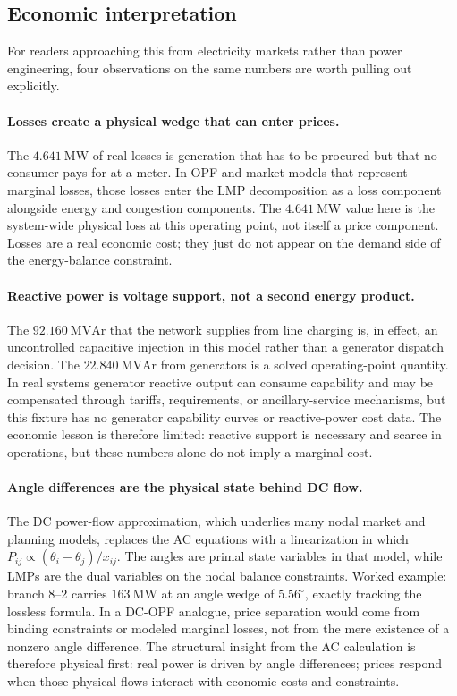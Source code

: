 \documentclass[11pt]{article}
\newcommand{\MW}{\mathrm{MW}}
\newcommand{\MVAr}{\mathrm{MVAr}}
\begin{document}
\subsection{Economic interpretation}

For readers approaching this from electricity markets rather than power
engineering, four observations on the same numbers are worth pulling out
explicitly.

\paragraph{Losses create a physical wedge that can enter prices.} The
$4.641~\MW$ of real losses is generation that has to be procured but
that no consumer pays for at a meter. In OPF and market models that
represent marginal losses, those losses enter the LMP decomposition as a
loss component alongside energy and congestion components. The
$4.641~\MW$ value here is the system-wide physical loss at this operating
point, not itself a price component. Losses are a real economic cost;
they just do not appear on the demand side of the energy-balance
constraint.

\paragraph{Reactive power is voltage support, not a second energy product.}
The $92.160~\MVAr$ that the network supplies from line charging is, in
effect, an uncontrolled capacitive injection in this model rather than a
generator dispatch decision. The $22.840~\MVAr$ from generators is a
solved operating-point quantity. In real systems generator reactive
output can consume capability and may be compensated through tariffs,
requirements, or ancillary-service mechanisms, but this fixture has no
generator capability curves or reactive-power cost data. The economic
lesson is therefore limited: reactive support is necessary and scarce in
operations, but these numbers alone do not imply a marginal cost.

\paragraph{Angle differences are the physical state behind DC flow.}
The DC power-flow approximation, which underlies many nodal market and
planning models, replaces the AC equations with a linearization in
which $P_{ij} \propto (\theta_i - \theta_j)/x_{ij}$. The angles are
primal state variables in that model, while LMPs are the dual variables
on the nodal balance constraints. Worked example: branch 8--2 carries
$163~\MW$ at an angle wedge of $5.56^\circ$, exactly tracking the
lossless formula. In a DC-OPF analogue, price separation would come from
binding constraints or modeled marginal losses, not from the mere
existence of a nonzero angle difference. The structural insight from the
AC calculation is therefore physical first: real power is driven by
angle differences; prices respond when those physical flows interact with
economic costs and constraints.
\end{document}
